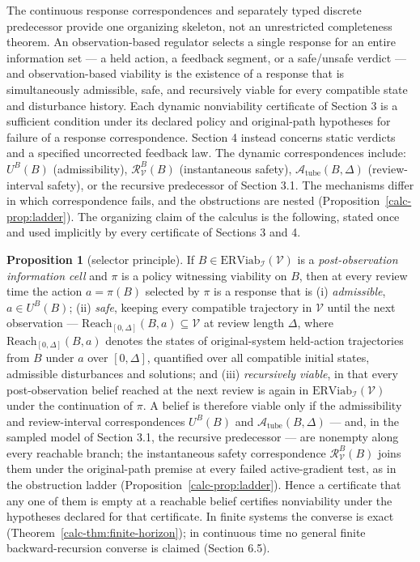 \documentclass[10pt,twocolumn]{article}
\theoremstyle{definition}
\newtheorem{proposition}{Proposition}
\begin{document}
The continuous response correspondences and separately typed discrete predecessor provide one organizing skeleton, not an unrestricted completeness theorem. An
observation-based regulator selects a single response for an entire
information set --- a held action, a feedback segment, or a
safe/unsafe verdict --- and observation-based viability is the existence
of a response that is simultaneously admissible, safe, and recursively
viable for every compatible state and disturbance history. Each dynamic nonviability certificate of Section 3 is a sufficient condition under its declared policy and original-path hypotheses for failure of a response correspondence. Section 4 instead concerns static verdicts and a specified uncorrected feedback law. The dynamic correspondences include:
\(U^B(B)\) (admissibility), \(\mathcal{R}_{\mathcal{V}}^B(B)\)
(instantaneous safety), \(\mathcal{A}_{\mathrm{tube}}(B,\Delta)\)
(review-interval safety), or the recursive predecessor of Section 3.1.
The mechanisms differ in which correspondence fails, and the
obstructions are nested (Proposition~\ref{calc-prop:ladder}). The organizing
claim of the calculus is the following, stated once and used implicitly
by every certificate of Sections 3 and 4.

\begin{proposition}[selector principle]\label{calc-prop:selector}
If \(B\in\mathrm{ERViab}_{\mathcal{I}}(\mathcal{V})\) is a \emph{post-observation information cell} and \(\pi\) is a
policy witnessing viability on \(B\), then at every review time the
action \(a=\pi(B)\) selected by \(\pi\) is a response that is
(i) \emph{admissible}, \(a\in U^B(B)\); (ii) \emph{safe}, keeping every
compatible trajectory in \(\mathcal{V}\) until the next observation ---
\(\mathrm{Reach}_{[0,\Delta]}(B,a)\subseteq\mathcal{V}\) at review
length \(\Delta\), where \(\mathrm{Reach}_{[0,\Delta]}(B,a)\) denotes
the states of original-system held-action trajectories from \(B\)
under \(a\) over \([0,\Delta]\), quantified over all compatible
initial states, admissible disturbances and solutions; and (iii) \emph{recursively viable}, in that every
post-observation belief reached at the next review is again in
\(\mathrm{ERViab}_{\mathcal{I}}(\mathcal{V})\) under the continuation
of \(\pi\). A belief is therefore viable only if the admissibility and
review-interval correspondences \(U^B(B)\) and
\(\mathcal{A}_{\mathrm{tube}}(B,\Delta)\) --- and, in the sampled
model of Section 3.1, the recursive predecessor --- are nonempty along
every reachable branch; the instantaneous safety correspondence
\(\mathcal{R}_{\mathcal{V}}^B(B)\) joins them under the original-path
premise at every failed active-gradient test, as in the obstruction
ladder (Proposition~\ref{calc-prop:ladder}). Hence a certificate that
any one of them is empty at a reachable belief certifies nonviability
under the hypotheses declared for that certificate. In finite systems
the converse is exact (Theorem~\ref{calc-thm:finite-horizon}); in continuous time no general finite backward-recursion converse is
claimed (Section 6.5).
\end{proposition}
\end{document}
